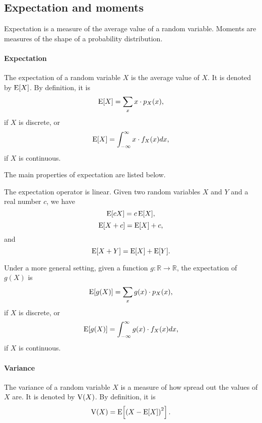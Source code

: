 \subsection{Expectation and moments}

Expectation is a measure of the average value of a random variable.  Moments are
measures of the shape of a probability distribution.

\paragraph{Expectation}  The expectation of a random variable $X$ is the average
value of $X$.  It is denoted by $\operatorname{E}[X]$.  By definition, it is
\begin{equation*}
  \operatorname{E}[X] = \sum_{x} x \cdot p_X(x)\text{,}
\end{equation*}
if $X$ is discrete, or
\begin{equation*}
  \operatorname{E}[X] = \int_{-\infty}^{\infty} x \cdot f_X(x) dx\text{,}
\end{equation*}
if $X$ is continuous.

The main properties of expectation are listed below.

The expectation operator is linear.  Given two random variables $X$ and $Y$ and a real
number $c$, we have
\begin{equation*}
  \operatorname{E}[c X] = c \operatorname{E}[X]\text{,}
\end{equation*}
\begin{equation*}
  \operatorname{E}[X + c] = \operatorname{E}[X] + c\text{,}
\end{equation*}
and
\begin{equation*}
  \operatorname{E}[X + Y] = \operatorname{E}[X] + \operatorname{E}[Y]\text{.}
\end{equation*}

Under a more general setting, given a function $g : \mathbb{R} \rightarrow \mathbb{R}$,
the expectation of $g(X)$ is
\begin{equation*}
  \operatorname{E}[g(X)] = \sum_{x} g(x) \cdot p_X(x)\text{,}
\end{equation*}
if $X$ is discrete, or
\begin{equation*}
  \operatorname{E}[g(X)] = \int_{-\infty}^{\infty} g(x) \cdot f_X(x) dx\text{,}
\end{equation*}
if $X$ is continuous.

\paragraph{Variance}  The variance of a random variable $X$ is a measure of how
spread out the values of $X$ are.  It is denoted by $\operatorname{V}(X)$.  By definition, it is
\begin{equation}
  \label{eq:variance}
  \operatorname{V}(X) = \operatorname{E}\!\left[\left(X - \operatorname{E}[X]\right)^2\right]\text{.}
\end{equation}

